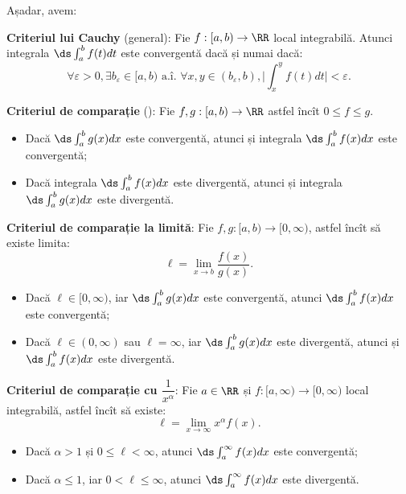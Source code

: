 Așadar, avem:

\textbf{Criteriul lui Cauchy} (general): Fie $f:[a, b) \to \RR$ local integrabilă.
Atunci integrala $\ds\int_a^b f(t) dt$ este convergentă dacă și numai dacă:
\[
    \forall \varepsilon > 0, \exists b_\varepsilon \in [a, b) \text{ a.î. } %
  \forall x, y \in (b_\varepsilon, b), \big| \int_x^y f(t) dt \big| < \varepsilon.
\]

\vspace{0.5cm}

\textbf{Criteriul de comparație} (): Fie $f, g : [a, b) \to \RR$
astfel încît $0 \leq f \leq g$.
\begin{itemize}
\item Dacă $\ds\int_a^b g(x) dx$ este convergentă, atunci și integrala
  $\ds\int_a^b f(x) dx$ este convergentă;
\item Dacă integrala $\ds\int_a^b f(x) dx$ este divergentă, atunci și integrala
  $\ds\int_a^b g(x) dx$ este divergentă.
\end{itemize}

\vspace{0.5cm}

\textbf{Criteriul de comparație la limită}: Fie $f, g : [a, b) \to [0, \infty)$,
astfel încît să existe limita:
\[
  \ell = \lim_{x \to b} \frac{f(x)}{g(x)}.
\]
\begin{itemize}
\item Dacă $\ell \in [0, \infty)$, iar $\ds\int_a^b g(x) dx$ este convergentă,
  atunci $\ds\int_a^b f(x) dx$ este convergentă;
\item Dacă $\ell \in (0, \infty)$ sau $\ell = \infty$, iar $\ds\int_a^b g(x) dx$
  este divergentă, atunci și $\ds\int_a^b f(x) dx$ este divergentă.
\end{itemize}

\vspace{0.5cm}

\textbf{Criteriul de comparație cu $\dfrac{1}{x^\alpha}$}:
Fie $a \in \RR$ și $f : [a, \infty) \to [0, \infty)$ local integrabilă, astfel
încît să existe:
\[
  \ell = \lim_{x \to \infty} x^\alpha f(x).
\]
\begin{itemize}
\item Dacă $\alpha > 1$ și $0 \leq \ell < \infty$, atunci $\ds\int_a^\infty f(x) dx$
  este convergentă;
\item Dacă $\alpha \leq 1$, iar $0 < \ell \leq \infty$, atunci $\ds\int_a^\infty f(x) dx$
  este divergentă.
\end{itemize}


